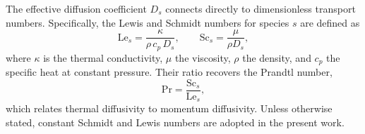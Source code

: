 The effective diffusion coefficient $D_s$ connects directly to dimensionless transport numbers. Specifically, the Lewis and Schmidt numbers for species $s$ are defined as
%
\begin{equation}
    \mathrm{Le}_s = \frac{\kappa}{\rho \, c_p \, D_s},
    \qquad
    \mathrm{Sc}_s = \frac{\mu}{\rho D_s},
    \label{eq:le_sc}
\end{equation}
%
where $\kappa$ is the thermal conductivity, $\mu$ the viscosity, $\rho$ the density, and $c_p$ the specific heat at constant pressure. Their ratio recovers the Prandtl number,
%
\begin{equation}
    \mathrm{Pr} = \frac{\mathrm{Sc}_s}{\mathrm{Le}_s},
    \label{eq:prandtl}
\end{equation}
%
which relates thermal diffusivity to momentum diffusivity. Unless otherwise stated, constant Schmidt and Lewis numbers are adopted in the present work.






